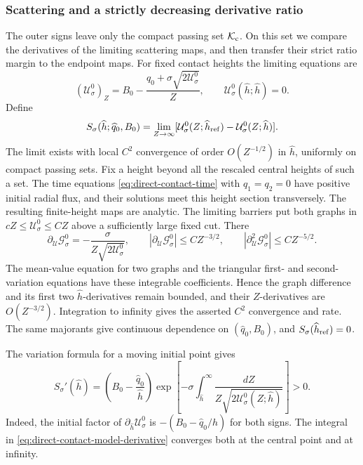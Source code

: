 \subsubsection{Scattering and a strictly decreasing derivative ratio}

The outer signs leave only the compact passing set
\(\mathcal K_{\rm c}\). On this set we compare the derivatives of the
limiting scattering maps, and then transfer their strict ratio
margin to the endpoint maps.
For fixed contact heights the limiting equations are
\begin{equation}
\label{eq:direct-contact-model}
 (\mathcal U_\sigma^0)_Z=B_0-\frac{\widehat q_0+\sigma\sqrt{2\mathcal U_\sigma^0}}{Z},
 \qquad \mathcal U_\sigma^0(\widehat h;\widehat h)=0 .
\end{equation}
Define
\begin{equation}
\label{eq:direct-contact-scattering}
 S_\sigma(\widehat h;\widehat q_0,B_0)=
 \lim_{Z\to\infty}
 [\mathcal U_\sigma^0(Z;\widehat h_{\rm ref})-\mathcal U_\sigma^0(Z;\widehat h)] .
\end{equation}
The limit exists with local $C^2$ convergence of order $O(Z^{-1/2})$
in $\widehat h$, uniformly on compact passing sets. Fix a height beyond
all the rescaled central heights of such a set. The time equations
\eqref{eq:direct-contact-time} with
$q_1=q_2=0$ have positive initial radial flux, and their solutions
meet this height section transversely. The resulting
finite-height maps are analytic.
The limiting barriers put both graphs in $cZ\le \mathcal U_\sigma^0\le CZ$
above a sufficiently large fixed cut. There
\[
 \partial_{\mathcal U}\mathcal G_\sigma^0=-\frac{\sigma}{Z\sqrt{2\mathcal U_\sigma^0}},\qquad
 |\partial_{\mathcal U}\mathcal G_\sigma^0|\le CZ^{-3/2},\qquad
 |\partial_{\mathcal U}^2\mathcal G_\sigma^0|\le CZ^{-5/2}.
\]
The mean-value equation for two graphs and the triangular first- and
second-variation equations have these integrable coefficients. Hence
the graph difference and its first two \(\widehat h\)-derivatives remain
bounded, and their \(Z\)-derivatives are \(O(Z^{-3/2})\). Integration to
infinity gives the asserted \(C^2\) convergence and rate. The same
majorants give continuous dependence on \((\widehat q_0,B_0)\), and
\(S_\sigma(\widehat h_{\rm ref})=0\).

The variation formula for a moving initial point gives
\begin{equation}
\label{eq:direct-contact-model-derivative}
 S_\sigma'(\widehat h)=
 \left(B_0-\frac{\widehat q_0}{\widehat h}\right)
 \exp\left[-\sigma\int_{\widehat h}^\infty
          \frac{dZ}{Z\sqrt{2\mathcal U_\sigma^0(Z;\widehat h)}}\right]>0 .
\end{equation}
Indeed, the initial factor of $\partial_{\widehat h}\mathcal U_\sigma^0$
is $-(B_0-\widehat q_0/\widehat h)$ for both signs. The integral in
\eqref{eq:direct-contact-model-derivative} converges both at the
central point and at infinity.

